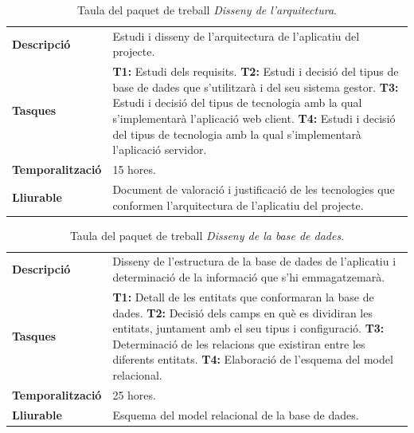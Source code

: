 \documentclass[a4paper,12pt]{ThesisStyle}
\begin{document}
\begin{table}[H]
  \begin{tabularx}{\textwidth}{l | X}
    \toprule
    \rowcolor{Green}
    \multicolumn{2}{c}{\texttt{\textbf{PT\_2.1:}} Disseny de l'arquitectura}\\
    \midrule[0.9pt]
    \textbf{Descripció}       & Estudi i disseny de l'arquitectura de l'aplicatiu del projecte.\\
    \midrule
    \textbf{Tasques}          & \textbf{T1:} Estudi dels requisits.
    \newline \textbf{T2:} Estudi i decisió del tipus de base de dades que s'utilitzarà i del seu sistema gestor.
    \newline \textbf{T3:} Estudi i decisió del tipus de tecnologia amb la qual s'implementarà l'aplicació web client.
    \newline \textbf{T4:} Estudi i decisió del tipus de tecnologia amb la qual s'implementarà l'aplicació servidor.\\
    \midrule
    \textbf{Temporalització}  & 15 hores.\\
    \midrule
    \textbf{Lliurable}        & Document de valoració i justificació de les tecnologies que conformen l'arquitectura de l'aplicatiu del projecte.\\
    \bottomrule
  \end{tabularx}
  \caption{\label{taula:pt_2.1} Taula del paquet de treball \emph{Disseny de l'arquitectura}.}
\end{table}

\begin{table}[H]
  \begin{tabularx}{\textwidth}{l | X}
    \toprule
    \rowcolor{Green}
    \multicolumn{2}{c}{\texttt{\textbf{PT\_2.2:}} Disseny de la base de dades}\\
    \midrule[0.9pt]
    \textbf{Descripció}       & Disseny de l'estructura de la base de dades de l'aplicatiu i determinació de la informació que s'hi emmagatzemarà.\\
    \midrule
    \textbf{Tasques}          & \textbf{T1:} Detall de les entitats que conformaran la base de dades.
    \newline \textbf{T2:} Decisió dels camps en què es dividiran les entitats, juntament amb el seu tipus i configuració.
    \newline \textbf{T3:} Determinació de les relacions que existiran entre les diferents entitats.
    \newline \textbf{T4:} Elaboració de l'esquema del model relacional.\\
    \midrule
    \textbf{Temporalització}  & 25 hores.\\
    \midrule
    \textbf{Lliurable}        & Esquema del model relacional de la base de dades.\\
    \bottomrule
  \end{tabularx}
  \caption{\label{taula:pt_2.2} Taula del paquet de treball \emph{Disseny de la base de dades}.}
\end{table}
\end{document}
